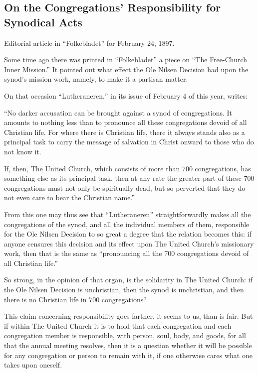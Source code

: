 
\subsection{On the Congregations’ Responsibility for Synodical Acts}

Editorial article in “Folkebladet” for February 24, 1897.

Some time ago there was printed in “Folkebladet” a piece on “The Free-Church Inner Mission.” It pointed out what effect the Ole Nilsen Decision had upon the synod’s mission work, namely, to make it a partisan matter.

On that occasion “Lutheraneren,” in its issue of February 4 of this year, writes:

“No darker accusation can be brought against a synod of congregations. It amounts to nothing less than to pronounce all these congregations devoid of all Christian life. For where there is Christian life, there it always stands also as a principal task to carry the message of salvation in Christ onward to those who do not know it.

If, then, The United Church, which consists of more than 700 congregations, has something else as its principal task, then at any rate the greater part of these 700 congregations must not only be spiritually dead, but so perverted that they do not even care to bear the Christian name.”

From this one may thus see that “Lutheraneren” straightforwardly makes all the congregations of the synod, and all the individual members of them, responsible for the Ole Nilsen Decision to so great a degree that the relation becomes this: if anyone censures this decision and its effect upon The United Church’s missionary work, then that is the same as “pronouncing all the 700 congregations devoid of all Christian life.”

So strong, in the opinion of that organ, is the solidarity in The United Church: if the Ole Nilsen Decision is unchristian, then the synod is unchristian, and then there is no Christian life in 700 congregations?

This claim concerning responsibility goes farther, it seems to us, than is fair. But if within The United Church it is to hold that each congregation and each congregation member is responsible, with person, soul, body, and goods, for all that the annual meeting resolves, then it is a question whether it will be possible for any congregation or person to remain with it, if one otherwise cares what one takes upon oneself.

